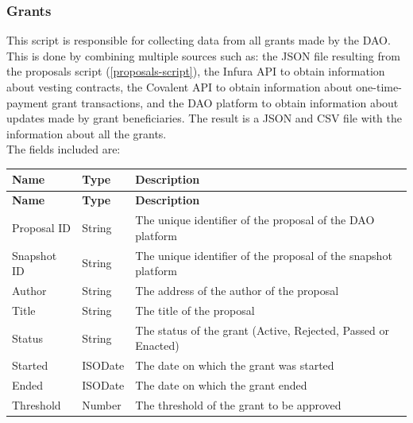 \documentclass[MSE,Master,english]{twbook}%
\begin{document}
\subsubsection{Grants}
This script is responsible for collecting data from all grants made by the \gls{DAO}. This is done by combining multiple sources such as: the JSON file resulting from the proposals script (\ref{proposals-script}), the Infura API to obtain information about vesting contracts, the Covalent API to obtain information about one-time-payment grant transactions, and the \gls{DAO} platform to obtain information about updates made by grant beneficiaries. The result is a JSON and CSV file with the information about all the grants. \\

The fields included are:
\begin{xltabular}{\textwidth}{|l|l|X|}
  \hline
  \textbf{Name} & \textbf{Type} & \textbf{Description}                         \\ \hline
  \endfirsthead
  \hline
  \textbf{Name} & \textbf{Type} & \textbf{Description}                         \\ \hline
  \endhead
  Proposal ID                    & String  & The unique identifier of the proposal of the \gls{DAO} platform                              \\ \hline
  Snapshot ID                    & String  & The unique identifier of the proposal of the snapshot platform                         \\ \hline
  Author                         & String  & The address of the author of the proposal                                              \\ \hline
  Title                          & String  & The title of the proposal                                                              \\ \hline
  Status                         & String  & The status of the grant (Active, Rejected, Passed or Enacted)                          \\ \hline
  Started                        & ISODate & The date on which the grant was started                                                \\ \hline
  Ended                          & ISODate & The date on which the grant ended                                                      \\ \hline
  Threshold                      & Number  & The threshold of the grant to be approved                                              \\ \hline

\end{xltabular}
\end{document}

